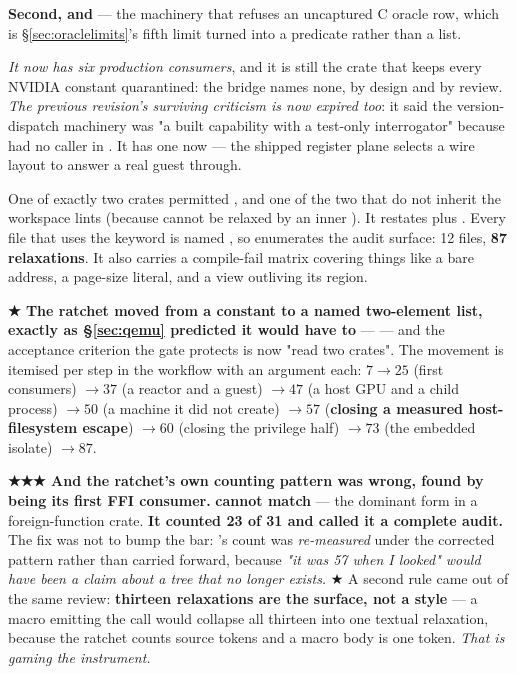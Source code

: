 \documentclass[10.5pt]{article}
\begin{document}
\textbf{Second,  and } — the machinery that refuses an
uncaptured C oracle row, which is \S\ref{sec:oraclelimits}'s fifth limit turned into a predicate
rather than a list.

\emph{It now has six production consumers}, and it is still the crate that keeps every NVIDIA
constant quarantined: the bridge names none, by design and by review. \emph{The previous
revision's surviving criticism is now expired too}: it said the version-dispatch machinery was "a
built capability with a test-only interrogator" because  had no caller
in . It has one now — the shipped register plane selects a wire layout to
answer a real guest through.

One of exactly two crates permitted , and one of the two that do not inherit the
workspace lints (because  cannot be relaxed by an inner ). It restates
 plus . Every
file that uses the keyword is named , so  enumerates the audit
surface: 12 files, \textbf{87 relaxations}. It also carries a  compile-fail matrix
covering things like a bare  address, a page-size literal, and a view outliving
its region.

\textbf{★ The ratchet moved from a constant to a named two-element list, exactly as
\S\ref{sec:qemu} predicted it would have to} —  — and the acceptance criterion the gate protects is now "read two crates".
The movement is itemised per step in the workflow with an argument each: $7 \to 25$ (first
consumers) $\to 37$ (a reactor and a guest) $\to 47$ (a host GPU and a child process) $\to 50$
(a machine it did not create) $\to 57$ (\textbf{closing a measured host-filesystem escape})
$\to 60$ (closing the privilege half) $\to 73$ (the embedded isolate) $\to 87$.

\begin{warnbox}\small
\textbf{★★★ And the ratchet's own counting pattern was wrong, found by being its first FFI
consumer.}  \textbf{cannot match }
— the dominant form in a foreign-function crate. \textbf{It counted 23 of 31 and called it a
complete audit.} The fix was not to bump the bar: 's count was
\emph{re-measured} under the corrected pattern rather than carried forward, because \emph{"it was
57 when I looked" would have been a claim about a tree that no longer exists.} ★ A second rule
came out of the same review: \textbf{thirteen relaxations are the surface, not a style} — a macro
emitting the call would collapse all thirteen into one textual relaxation, because the ratchet
counts source tokens and a macro body is one token. \emph{That is gaming the instrument.}
\end{warnbox}
\end{document}
